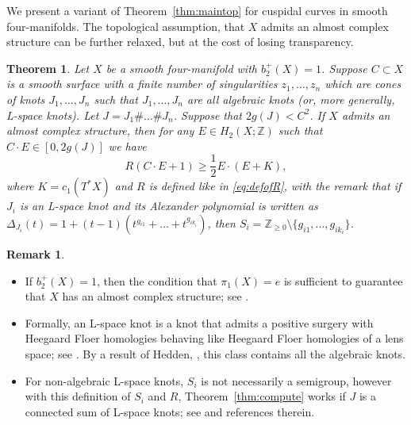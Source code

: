 \documentclass[11pt]{amsart}
\numberwithin{equation}{section}
\theoremstyle{plain}
\newtheorem{theorem}[equation]{Theorem}
\theoremstyle{definition}
\newtheorem{remark}[equation]{Remark}
\begin{document}
\smallskip
We present a variant of Theorem~\ref{thm:maintop} for cuspidal curves in smooth four-manifolds. The topological assumption, that $X$
admits an almost complex structure can be further relaxed, but at the cost of losing transparency.
\begin{theorem}\label{thm:maintop2}
Let $X$ be a smooth four-manifold with $b_2^+(X)=1$.
Suppose $C\subset X$ is a smooth surface with a finite number of singularities $z_1,\ldots,z_n$ which are cones of knots $J_1,\ldots,J_n$
such that $J_1,\ldots,J_n$ are all algebraic knots (or, more generally, L-space knots). Let $J=J_1\#\ldots\#J_n$. Suppose that $2g(J)<C^2$.
If $X$ admits an almost complex structure, then for any $E\in H_2(X;{\mathbb Z})$ such that $C\cdot E\in[0,2g(J)]$ we have
\[R(C\cdot E+1)\ge \frac12 E\cdot(E+K),\]
where $K=c_1(T^*X)$ and $R$ is defined like in \eqref{eq:defofR}, with the remark that if $J_i$ is an L-space knot and its Alexander polynomial
is written as $\Delta_{J_i}(t)=1+(t-1)(t^{g_{i1}}+\ldots+t^{g_{ik_i}})$, then $S_i={\mathbb Z}_{\ge 0}\setminus\{g_{i1},\ldots,g_{ik_i}\}$.
\end{theorem}
\begin{remark}\
\begin{itemize}
\item If $b_2^+(X)=1$, then the condition that $\pi_1(X)=e$ is sufficient to guarantee that $X$ has an almost complex structure; see \cite[Theorem 1.4.15 and
Exercise 1.4.16(b)]{GS}.
\item Formally, an L-space knot is a knot that admits a positive surgery with Heegaard Floer homologies behaving like Heegaard Floer homologies of a lens space;
see \cite{OSlspace}. By a result of Hedden, \cite{Hed}, this class contains all the algebraic knots.
\item For non-algebraic L-space knots, $S_i$ is not necessarily a semigroup, however with this definition of $S_i$ and $R$, Theorem~\ref{thm:compute}
works if $J$ is a connected sum of L-space knots; see \cite{BL2} and references therein.
\end{itemize}
\end{remark}
\end{document}
